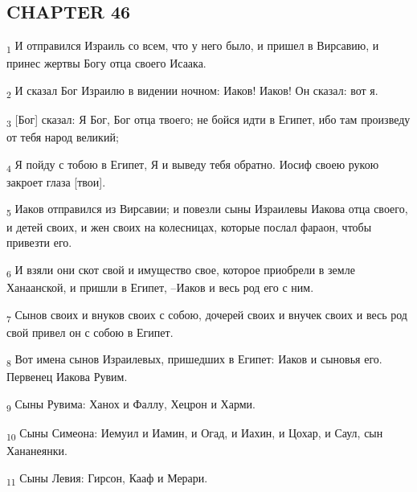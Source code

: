 \subsection{CHAPTER 46}
\begin{tcolorbox}
\textsubscript{1} И отправился Израиль со всем, что у него было, и пришел в Вирсавию, и принес жертвы Богу отца своего Исаака.
\end{tcolorbox}
\begin{tcolorbox}
\textsubscript{2} И сказал Бог Израилю в видении ночном: Иаков! Иаков! Он сказал: вот я.
\end{tcolorbox}
\begin{tcolorbox}
\textsubscript{3} [Бог] сказал: Я Бог, Бог отца твоего; не бойся идти в Египет, ибо там произведу от тебя народ великий;
\end{tcolorbox}
\begin{tcolorbox}
\textsubscript{4} Я пойду с тобою в Египет, Я и выведу тебя обратно. Иосиф своею рукою закроет глаза [твои].
\end{tcolorbox}
\begin{tcolorbox}
\textsubscript{5} Иаков отправился из Вирсавии; и повезли сыны Израилевы Иакова отца своего, и детей своих, и жен своих на колесницах, которые послал фараон, чтобы привезти его.
\end{tcolorbox}
\begin{tcolorbox}
\textsubscript{6} И взяли они скот свой и имущество свое, которое приобрели в земле Ханаанской, и пришли в Египет, --Иаков и весь род его с ним.
\end{tcolorbox}
\begin{tcolorbox}
\textsubscript{7} Сынов своих и внуков своих с собою, дочерей своих и внучек своих и весь род свой привел он с собою в Египет.
\end{tcolorbox}
\begin{tcolorbox}
\textsubscript{8} Вот имена сынов Израилевых, пришедших в Египет: Иаков и сыновья его. Первенец Иакова Рувим.
\end{tcolorbox}
\begin{tcolorbox}
\textsubscript{9} Сыны Рувима: Ханох и Фаллу, Хецрон и Харми.
\end{tcolorbox}
\begin{tcolorbox}
\textsubscript{10} Сыны Симеона: Иемуил и Иамин, и Огад, и Иахин, и Цохар, и Саул, сын Хананеянки.
\end{tcolorbox}
\begin{tcolorbox}
\textsubscript{11} Сыны Левия: Гирсон, Кааф и Мерари.
\end{tcolorbox}
